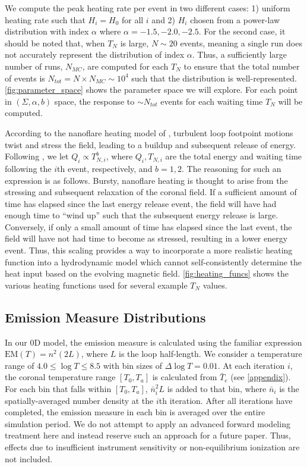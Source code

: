 \documentclass[tighten,apj]{emulateapj}
\begin{document}
	\par We compute the peak heating rate per event in two different cases: 1) uniform heating rate such that $H_i=H_0$ for all $i$ and 2) $H_i$ chosen from a power-law distribution with index $\alpha$ where $\alpha=-1.5,-2.0,-2.5$. For the second case, it should be noted that, when $T_N$ is large, $N\sim20$ events, meaning a single run does not accurately represent the distribution of index $\alpha$. Thus, a sufficiently large number of runs, $N_{MC}$, are computed for each $T_N$ to ensure that the total number of events is $N_{tot}=N\times N_{MC}\sim10^4$ such that the distribution is well-represented. \autoref{fig:parameter_space} shows the parameter space we will explore. For each point in $(\Sigma,\alpha,b)$ space, the response to $\sim N_{tot}$ events for each waiting time $T_N$ will be computed.
	\par According to the nanoflare heating model of \citep{parker_nanoflares_1988}, turbulent loop footpoint motions twist and stress the field, leading to a buildup and subsequent release of energy. Following \citet{cargill_active_2014}, we let $Q_i\propto T_{N,i}^b$, where $Q_i,T_{N,i}$ are the total energy and waiting time following the $i$th event, respectively, and $b=1,2$. The reasoning for such an expression is as follows. Bursty, nanoflare heating is thought to arise from the stressing and subsequent relaxation of the coronal field. If a sufficient amount of time has elapsed since the last energy release event, the field will have had enough time to ``wind up'' such that the subsequent energy release is large. Conversely, if only a small amount of time has elapsed since the last event, the field will have not had time to become as stressed, resulting in a lower energy event. Thus, this scaling provides a way to incorporate a more realistic heating function into a hydrodynamic model which cannot self-consistently determine the heat input based on the evolving magnetic field. \autoref{fig:heating_funcs} shows the various heating functions used for several example $T_N$ values.
	\subsection{Emission Measure Distributions}
	\label{subsec:em_dist}
	\par In our 0D model, the emission measure is calculated using the familiar expression $\mathrm{EM}(T)=n^2(2L)$, where $L$ is the loop half-length. We consider a temperature range of $4.0\le\log{T}\le8.5$ with bin sizes of $\Delta\log{T}=0.01$. At each iteration $i$, the coronal temperature range $[T_0,T_a]$ is calculated from $\bar{T}_e$ (see \autoref{appendix}). For each bin that falls within $[T_0,T_a]$, $\bar{n}_i^2L$ is added to that bin, where $\bar{n}_i$ is the spatially-averaged number density at the $i$th iteration. After all iterations have completed, the emission measure in each bin is averaged over the entire simulation period. We do not attempt to apply an advanced forward modeling treatment here and instead reserve such an approach for a future paper. Thus, effects due to insufficient instrument sensitivity or non-equilibrium ionization are not included.
\end{document}
